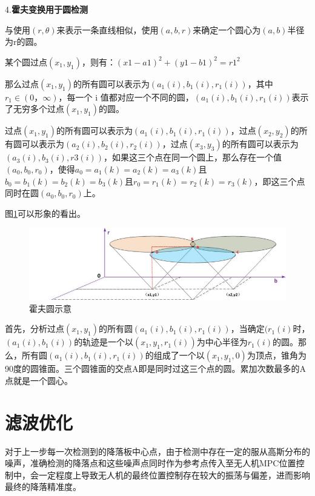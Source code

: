 4.\textbf{霍夫变换用于圆检测}

与使用$(r, \theta)$来表示一条直线相似，使用$(a, b, r)$来确定一个圆心为$(a, b)$半径为r的圆。

某个圆过点$(x_{1}, y_{1})$，则有：$(x1-a1)^2 + (y1-b1)^2 = r1^2$

那么过点$(x_{1}, y_{1})$的所有圆可以表示为$(a_{1}(i), b_{1}(i), r_{1}(i))$，其中$r_{1} \in (0，\infty)$，每⼀个 i 值都对应⼀个不同的圆，$(a_{1}(i), b_{1}(i), r_{1}(i))$表示了无穷多个过点$(x_{1}, y_{1})$的圆。

过点$(x_{1}, y_{1})$的所有圆可以表示为$(a_{1}(i), b_{1}(i),r_{1}(i))$，过点$(x_{2}, y_{2})$的所有圆可以表示为$(a_{2}(i),b_{2}(i),r_{2}(i))$，过点$(x_{3}, y_{3})$的所有圆可以表示为$(a_{3}(i),b_{3}(i),r3(i))$，如果这三个点在同一个圆上，那么存在一个值$(a_{0},b_{0},r_{0})$，使得$a_{0} = a_{1}(k) = a_{2}(k) = a_{3}(k)$且$b_{0} = b_{1}(k) = b_{2}(k) = b_{3}(k)$且$r_{0} = r_{1}(k) = r_{2}(k) = r_{3}(k)$，即这三个点同时在圆$(a_{0}, b_{0}, r_{0})$上。

图\ref{Fig:img2}可以形象的看出。

\begin{figure}[ht]
  \centering
  \includegraphics[width=0.8\linewidth]{./Figure/Hough_Circle.png}
  \caption{霍夫圆示意}\label{Fig:img2}
\end{figure}

⾸先，分析过点$(x_{1}, y_{1})$的所有圆$(a_{1}(i), b_{1}(i),r_{1}(i))$，当确定$(r_{1}(i)$时，$(a_{1}(i), b_{1}(i))$的轨迹是⼀个以$(x_{1}, y_{1}, r_{1}(i))$为中心半径为$r_{1}(i)$的圆。那么，所有圆$(a_{1}(i), b_{1}(i),r_{1}(i))$的组成了一个以$(x_{1}, y_{1}, 0)$为顶点，锥角为90度的圆锥面。三个圆锥面的交点A即是同时过这三个点的圆。累加次数最多的A点就是一个圆心。

\section{滤波优化}

对于上一步每一次检测到的降落板中心点，由于检测中存在一定的服从高斯分布的噪声，准确检测的降落点和这些噪声点同时作为参考点传入至无人机MPC位置控制中，会一定程度上导致无人机的最终位置控制存在较大的振荡与偏差，进而影响最终的降落精准度。

